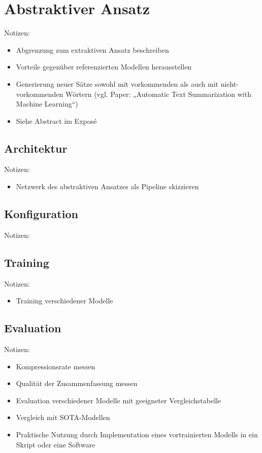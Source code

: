 \chapter{Abstraktiver Ansatz}
\thispagestyle{fancy}
\label{chap:Abstraktiver Ansatz}

Notizen:
\begin{itemize}
	\item Abgrenzung zum extraktiven Ansatz beschreiben
	\item Vorteile gegenüber referenzierten Modellen herausstellen
	\item Generierung neuer Sätze sowohl mit vorkommenden als auch mit nicht-vorkommenden Wörtern (vgl. Paper: „Automatic Text Summarization with Machine Learning“)
	\item Siehe Abstract im Exposé
\end{itemize}


\section{Architektur}
Notizen:
\begin{itemize}
	\item Netzwerk des abstraktiven Ansatzes als Pipeline skizzieren
\end{itemize}


\section{Konfiguration}
Notizen:


\section{Training}
Notizen:
\begin{itemize}
	\item Training verschiedener Modelle
\end{itemize}


\section{Evaluation}
Notizen:
\begin{itemize}
	\item Kompressionsrate messen
	\item Qualität der Zusammenfassung messen
	\item Evaluation verschiedener Modelle mit geeigneter Vergleichstabelle
	\item Vergleich mit SOTA-Modellen
	\item Praktische Nutzung durch Implementation eines vortrainierten Modells in ein Skript oder eine Software
\end{itemize}
